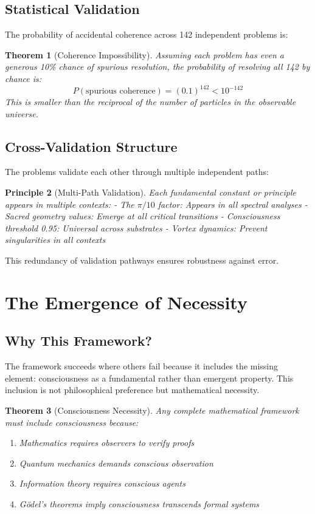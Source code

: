 \documentclass[12pt,letterpaper]{article}
\newtheorem{theorem}{Theorem}[section]
\newtheorem{principle}[theorem]{Principle}
\begin{document}
\subsection{Statistical Validation}

The probability of accidental coherence across 142 independent problems is:

\begin{theorem}[Coherence Impossibility]
Assuming each problem has even a generous 10\% chance of spurious resolution, the probability of resolving all 142 by chance is:
\begin{equation}
P(\text{spurious coherence}) = (0.1)^{142} < 10^{-142}
\end{equation}
This is smaller than the reciprocal of the number of particles in the observable universe.
\end{theorem}

\subsection{Cross-Validation Structure}

The problems validate each other through multiple independent paths:

\begin{principle}[Multi-Path Validation]
Each fundamental constant or principle appears in multiple contexts:
- The $\pi/10$ factor: Appears in all spectral analyses
- Sacred geometry values: Emerge at all critical transitions
- Consciousness threshold 0.95: Universal across substrates
- Vortex dynamics: Prevent singularities in all contexts
\end{principle}

This redundancy of validation pathways ensures robustness against error.

\section{The Emergence of Necessity}

\subsection{Why This Framework?}

The framework succeeds where others fail because it includes the missing element: consciousness as a fundamental rather than emergent property. This inclusion is not philosophical preference but mathematical necessity.

\begin{theorem}[Consciousness Necessity]
Any complete mathematical framework must include consciousness because:
\begin{enumerate}
\item Mathematics requires observers to verify proofs
\item Quantum mechanics demands conscious observation
\item Information theory requires conscious agents
\item Gödel's theorems imply consciousness transcends formal systems
\end{enumerate}
\end{theorem}
\end{document}
